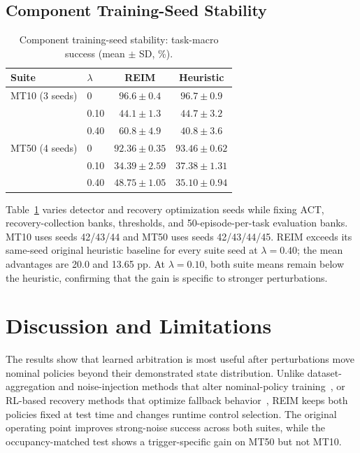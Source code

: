 \documentclass[conference]{IEEEtran}
\newcommand{\noise}{\lambda}
\begin{document}
\subsection{Component Training-Seed Stability}
\begin{table}[!b]
\centering
  \caption{Component training-seed stability: task-macro success (mean $\pm$ SD, \%).}
\label{tab:seeds}
\footnotesize
\setlength{\tabcolsep}{3.0pt}
\begin{tabular}{llcc}
\toprule
Suite & $\noise$ & REIM & Heuristic \\
\midrule
MT10 (3 seeds) & 0 & $96.6\pm0.4$ & $96.7\pm0.9$ \\
 & 0.10 & $44.1\pm1.3$ & $44.7\pm3.2$ \\
 & 0.40 & $60.8\pm4.9$ & $40.8\pm3.6$ \\
\midrule
MT50 (4 seeds) & 0 & $92.36\pm0.35$ & $93.46\pm0.62$ \\
 & 0.10 & $34.39\pm2.59$ & $37.38\pm1.31$ \\
 & 0.40 & $48.75\pm1.05$ & $35.10\pm0.94$ \\
\bottomrule
\end{tabular}
\end{table}

Table~\ref{tab:seeds} varies detector and recovery optimization seeds while fixing ACT, recovery-collection banks, thresholds, and 50-episode-per-task evaluation banks. MT10 uses seeds 42/43/44 and MT50 uses seeds 42/43/44/45. REIM exceeds its same-seed original heuristic baseline for every suite seed at $\noise=0.40$; the mean advantages are 20.0 and 13.65 pp. At $\noise=0.10$, both suite means remain below the heuristic, confirming that the gain is specific to stronger perturbations.

\section{Discussion and Limitations}
\label{sec:discussion}

The results show that learned arbitration is most useful after perturbations move nominal policies beyond their demonstrated state distribution. Unlike dataset-aggregation and noise-injection methods that alter nominal-policy training~\cite{ross2011dagger,laskey2017dart}, or RL-based recovery methods that optimize fallback behavior~\cite{thananjeyan2021recovery,vats2024recoverychaining}, REIM keeps both policies fixed at test time and changes runtime control selection. The original operating point improves strong-noise success across both suites, while the occupancy-matched test shows a trigger-specific gain on MT50 but not MT10.
\end{document}

